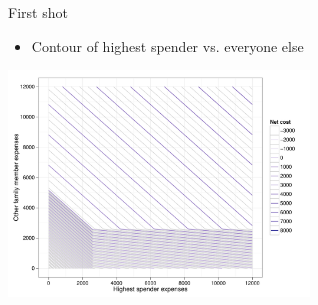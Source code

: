 \documentclass[sans,aspectratio=169,presentation,bigger,fleqn]{beamer}
\begin{document}
\begin{frame}[label=sec-17]{First shot}
\begin{itemize}
\item Contour of highest spender vs. everyone else
\end{itemize}

\begin{center}
\includegraphics[height=6cm]{./img/ins-contour.pdf}
\end{center}
\end{frame}
\end{document}
